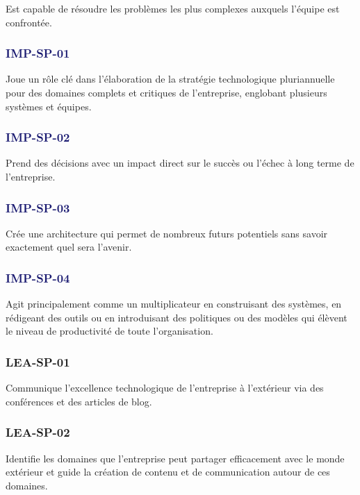 \documentclass[a4paper, french, openany, 12pt]{book}
\newcommand\wis[1]{\textcolor{MidnightBlue}{\textbf{\uppercase{imp-{#1}}}}}
\newcommand\cha[1]{\textcolor{OliveGreen}{\textbf{\uppercase{lea-{#1}}}}}
\begin{document}
\begin{multicols}{2}
  Est capable de résoudre les problèmes les plus complexes auxquels l'équipe est confrontée.

  \subsubsection*{\wis{sp-01}}

  Joue un rôle clé dans l'élaboration de la stratégie technologique pluriannuelle pour des domaines complets et critiques 
  de l'entreprise, englobant plusieurs systèmes et équipes.

  \subsubsection*{\wis{sp-02}}

  Prend des décisions avec un impact direct sur le succès ou l'échec à long terme de l'entreprise.
  
  \subsubsection*{\wis{sp-03}}

  Crée une architecture qui permet de nombreux futurs potentiels sans savoir exactement quel sera l'avenir.

  \subsubsection*{\wis{sp-04}}

  Agit principalement comme un multiplicateur en construisant des systèmes, en rédigeant des outils ou en introduisant 
  des politiques ou des modèles qui élèvent le niveau de productivité de toute l'organisation.

  \subsubsection*{\cha{sp-01}}

  Communique l'excellence technologique de l'entreprise à l'extérieur via des conférences et des articles de blog. 
  
  \subsubsection*{\cha{sp-02}}

  Identifie les domaines que l'entreprise peut partager efficacement avec le monde extérieur et guide la création de 
  contenu et de communication autour de ces domaines.


\end{multicols}
\end{document}
